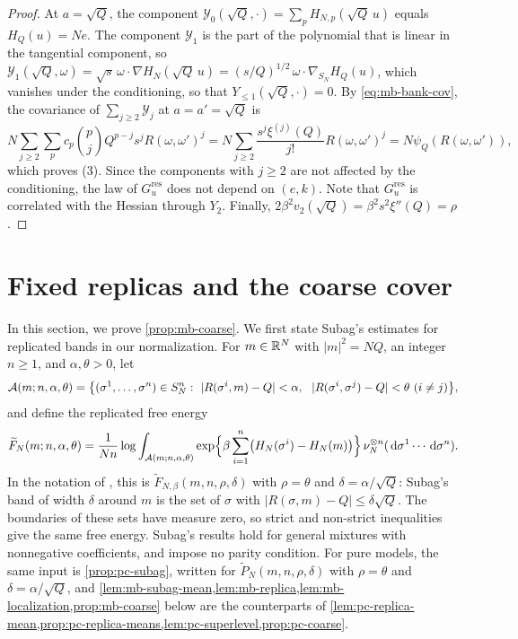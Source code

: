 \begin{proof}
At $a=\sqrt Q$, the component $\mathcal Y_0(\sqrt Q,\cdot)=\sum_pH_{N,p}(\sqrt Q\,u)$ equals $H_Q(u)=Ne$. The component $\mathcal Y_1$ is the part of the polynomial that is linear in the tangential component, so $\mathcal Y_1(\sqrt Q,\omega)=\sqrt s\,\omega\cdot\nabla H_N(\sqrt Q\,u)=(s/Q)^{1/2}\,\omega\cdot\nabla_{S_N}H_Q(u)$, which vanishes under the conditioning, so that $Y_{\le1}(\sqrt Q,\cdot)=0$. By \eqref{eq:mb-bank-cov}, the covariance of $\sum_{j\ge2}\mathcal Y_j$ at $a=a'=\sqrt Q$ is
\[
N\sum_{j\ge2}\sum_pc_p\binom pjQ^{p-j}s^jR(\omega,\omega')^j=N\sum_{j\ge2}\frac{s^j\xi^{(j)}(Q)}{j!}R(\omega,\omega')^j=N\psi_Q(R(\omega,\omega')),
\]
which proves (3). Since the components with $j\ge2$ are not affected by the conditioning, the law of $G^{\mathrm{res}}_u$ does not depend on $(e,k)$. Note that $G^{\mathrm{res}}_u$ is correlated with the Hessian through $Y_2$. Finally, $2\beta^2v_2(\sqrt Q)=\beta^2s^2\xi''(Q)=\rho$.
\end{proof}

\section{Fixed replicas and the coarse cover}\label{sec:mb-coarse}

In this section, we prove \cref{prop:mb-coarse}. We first state Subag's estimates for replicated bands in our normalization. For $m\in\mathbb R^N$ with $|m|^2=NQ$, an integer $n\ge1$, and $\alpha,\theta>0$, let
\[
\cA(m;n,\alpha,\theta)=\bigl\{(\sigma^1,\dots,\sigma^n)\in S_N^n:\ |R(\sigma^i,m)-Q|<\alpha,\ \ |R(\sigma^i,\sigma^j)-Q|<\theta\ (i\neq j)\bigr\},
\]
and define the replicated free energy
\begin{equation}\label{eq:mb-replicated}
\widetilde F_N(m;n,\alpha,\theta)=\frac1{Nn}\log\int_{\mathcal A(m;n,\alpha,\theta)}\exp\Bigl\{\beta\sum_{i=1}^n\bigl(H_N(\sigma^i)-H_N(m)\bigr)\Bigr\}\,\nu_N^{\otimes n}(\,\mathrm d\sigma^1\cdots\,\mathrm d\sigma^n).
\end{equation}
In the notation of \cite{Subag2024}, this is $\widetilde F_{N,\beta}(m,n,\rho,\delta)$ with $\rho=\theta$ and $\delta=\alpha/\sqrt Q$: Subag's band of width $\delta$ around $m$ is the set of $\sigma$ with $|R(\sigma,m)-Q|\le\delta\sqrt Q$. The boundaries of these sets have measure zero, so strict and non-strict inequalities give the same free energy. Subag's results hold for general mixtures with nonnegative coefficients, and impose no parity condition. For pure models, the same input is \cref{prop:pc-subag}, written for $\widetilde P_N(m,n,\rho,\delta)$ with $\rho=\theta$ and $\delta=\alpha/\sqrt Q$, and \cref{lem:mb-subag-mean,lem:mb-replica,lem:mb-localization,prop:mb-coarse} below are the counterparts of \cref{lem:pc-replica-mean,prop:pc-replica-means,lem:pc-superlevel,prop:pc-coarse}.


